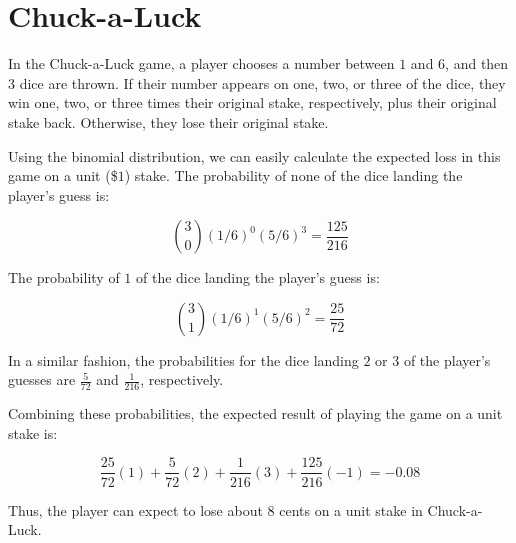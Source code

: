 \documentclass{article}
\date{}
\author{Kaan Aksoy | Feb 13, 2020}
\begin{document}
\maketitle

\section{Chuck-a-Luck}

In the Chuck-a-Luck game, a player chooses a number 
between $1$ and $6$, and then $3$ dice are thrown. 
If their number appears on one, two, or three 
of the dice, they win one, two, or three times their 
original stake, respectively, plus their original 
stake back. Otherwise, they lose their original stake.

Using the binomial distribution, we can easily calculate 
the expected loss in this game on a unit (\$$1$) stake. The 
probability of none of the dice landing the player's 
guess is:

$$ \binom{3}{0}(1/6)^0(5/6)^3 = \frac{125}{216} $$

The probability of $1$ of the dice landing the player's 
guess is:

$$ \binom{3}{1}(1/6)^1(5/6)^2 = \frac{25}{72} $$

In a similar fashion, the probabilities for the dice landing 
$2$ or $3$ of the player's guesses are $\frac{5}{72}$ and 
$\frac{1}{216}$, respectively.

Combining these probabilities, the expected result of playing 
the game on a unit stake is:

$$ \frac{25}{72}(1) + \frac{5}{72}(2) + \frac{1}{216}(3) 
+ \frac{125}{216}(-1) = -0.08$$

Thus, the player can expect to lose about $8$ cents on a 
unit stake in Chuck-a-Luck.
\end{document}
